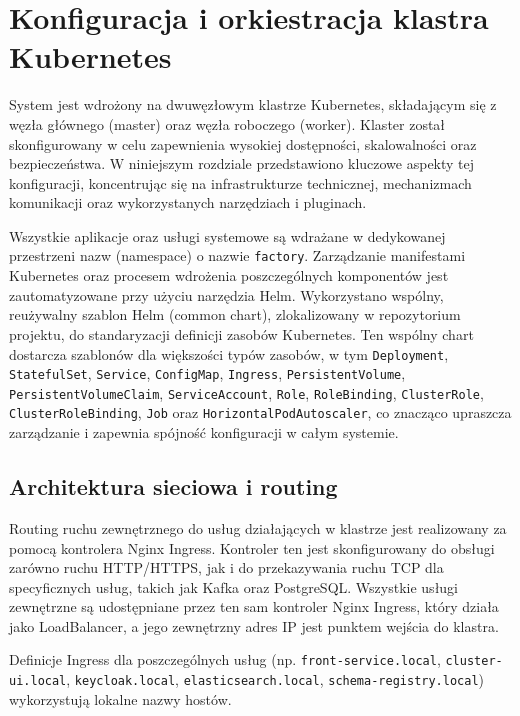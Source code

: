 \section{Konfiguracja i orkiestracja klastra Kubernetes}
\label{chap:konfiguracja_kubernetes}

System jest wdrożony na dwuwęzłowym klastrze Kubernetes, składającym się z węzła głównego (master) oraz węzła roboczego (worker). Klaster został skonfigurowany w celu zapewnienia wysokiej dostępności, skalowalności oraz bezpieczeństwa. W niniejszym rozdziale przedstawiono kluczowe aspekty tej konfiguracji, koncentrując się na infrastrukturze technicznej, mechanizmach komunikacji oraz wykorzystanych narzędziach i pluginach.

Wszystkie aplikacje oraz usługi systemowe są wdrażane w dedykowanej przestrzeni nazw (namespace) o nazwie \texttt{factory}. Zarządzanie manifestami Kubernetes oraz procesem wdrożenia poszczególnych komponentów jest zautomatyzowane przy użyciu narzędzia Helm. Wykorzystano wspólny, reużywalny szablon Helm (common chart), zlokalizowany w repozytorium projektu, do standaryzacji definicji zasobów Kubernetes. Ten wspólny chart dostarcza szablonów dla większości typów zasobów, w tym \texttt{Deployment}, \texttt{StatefulSet}, \texttt{Service}, \texttt{ConfigMap}, \texttt{Ingress}, \texttt{PersistentVolume}, \texttt{PersistentVolumeClaim}, \texttt{ServiceAccount}, \texttt{Role}, \texttt{RoleBinding}, \texttt{ClusterRole}, \\ \texttt{ClusterRoleBinding}, \texttt{Job} oraz \texttt{HorizontalPodAutoscaler}, co znacząco upraszcza zarządzanie i zapewnia spójność konfiguracji w całym systemie.

\subsection{Architektura sieciowa i routing}

Routing ruchu zewnętrznego do usług działających w klastrze jest realizowany za pomocą kontrolera Nginx Ingress. Kontroler ten jest skonfigurowany do obsługi zarówno ruchu HTTP/HTTPS, jak i do przekazywania ruchu TCP dla specyficznych usług, takich jak Kafka oraz PostgreSQL. Wszystkie usługi zewnętrzne są udostępniane przez ten sam kontroler Nginx Ingress, który działa jako LoadBalancer, a jego zewnętrzny adres IP jest punktem wejścia do klastra.

Definicje Ingress dla poszczególnych usług (np. \texttt{front-service.local}, \texttt{cluster-ui.local}, \texttt{keycloak.local}, \texttt{elasticsearch.local}, \texttt{schema-registry.local}) wykorzystują lokalne nazwy hostów.

